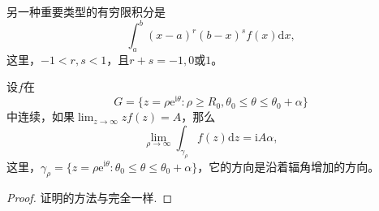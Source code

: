 \documentclass[../../main.tex]{subfiles}
\begin{document}
另一种重要类型的有穷限积分是
\[
\int_{a}^{b} (x - a)^r (b - x)^s f(x) \mathrm{d}x,
\]
这里，\( -1 < r, s < 1 \)，且\( r + s = -1, 0 \)或\( 1 \)。

\begin{lemma}\label{lemma:引理5.5.15}
设\( f \)在
\[
G = \{ z = \rho \mathrm{e}^{\mathrm{i}\theta} : \rho \geqslant R_0, \theta_0 \leqslant \theta \leqslant \theta_0 + \alpha \}
\]
中连续，如果\(\lim_{z \to \infty} z f(z) = A\)，那么
\[
\lim_{\rho \to \infty} \int_{\gamma_{\rho}} f(z) \mathrm{d}z = \mathrm{i}A\alpha,
\]
这里，\(\gamma_{\rho} = \{ z = \rho \mathrm{e}^{\mathrm{i}\theta} : \theta_0 \leqslant \theta \leqslant \theta_0 + \alpha \}\)，它的方向是沿着辐角增加的方向。
\end{lemma}
\begin{proof}
证明的方法与完全一样.
\end{proof}
\end{document}

